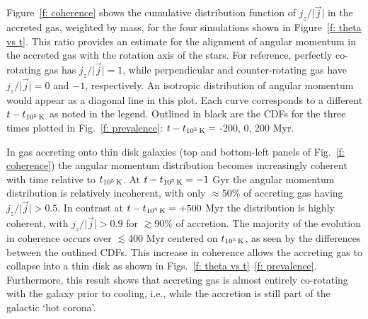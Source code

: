 \documentclass[fleqn,usenatbib]{mnras}
\newcommand{\tcon}{t_{10^5\,{\rm K}}}
\begin{document}
Figure~\ref{f: coherence} shows the cumulative distribution function of $j_z / \vert \vec j \vert$ in the accreted gas, weighted by mass, for the four simulations shown in Figure~\ref{f: theta vs t}.
This ratio provides an estimate for the alignment of  angular momentum in the accreted gas with the rotation axis of the stars.
For reference, perfectly co-rotating gas has $j_z / \vert \vec j \vert = 1$, while perpendicular and counter-rotating gas have $j_z / \vert \vec j \vert = 0$ and $-1$, respectively.
An isotropic distribution of angular momentum would appear as a diagonal line in this plot. 
Each curve corresponds to a different $t - \tcon$ as noted in the legend. 
Outlined in black are the CDFs for the three times plotted in Fig.~\ref{f: prevalence}: $t - \tcon =$ -200, 0, 200 Myr.

In gas accreting onto thin disk galaxies (top and bottom-left panels of Fig.~\ref{f: coherence})  the angular momentum distribution becomes increasingly coherent with time relative to $\tcon$.
At $t-\tcon=-1$ Gyr the angular momentum distribution is relatively incoherent, with only $\approx50\%$ of accreting gas having $j_z/\vert \vec j \vert > 0.5$.
In contrast at $t-\tcon=+500$ Myr the distribution is highly coherent, with $j_z/\vert \vec j \vert > 0.9$ for $\gtrsim 90\%$ of accretion.
The majority of the evolution in coherence occurs over $\lesssim 400$ Myr centered on $\tcon$, as seen by the differences between the outlined CDFs.
This increase in coherence allows the accreting gas to collapse into a thin disk as shown in Figs.~\ref{f: theta vs t}--\ref{f: prevalence}.
Furthermore, this result shows that accreting gas is almost entirely co-rotating with the galaxy prior to cooling, i.e., while the accretion is still part of the galactic `hot corona'.

\end{document}

